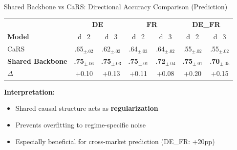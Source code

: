 \documentclass[aspectratio=169]{beamer}
\begin{document}
\begin{frame}{Shared Backbone vs CaRS: Directional Accuracy Comparison (Prediction)}
\begin{table}
\centering
\small
\begin{tabular}{l|cc|cc|cc}
\toprule
& \multicolumn{2}{c|}{\textbf{DE}} & \multicolumn{2}{c|}{\textbf{FR}} & \multicolumn{2}{c}{\textbf{DE\_FR}} \\
\textbf{Model} & d=2 & d=3 & d=2 & d=3 & d=2 & d=3 \\
\midrule
CaRS & .65$_{\pm.02}$ & .62$_{\pm.02}$ & .64$_{\pm.03}$ & .64$_{\pm.02}$ & .55$_{\pm.02}$ & .55$_{\pm.02}$ \\
\textbf{Shared Backbone} & \textbf{.75}$_{\pm.06}$ & \textbf{.75}$_{\pm.03}$ & \textbf{.75}$_{\pm.01}$ & \textbf{.72}$_{\pm.04}$ & \textbf{.75}$_{\pm.01}$ & \textbf{.70}$_{\pm.05}$ \\
\midrule
$\Delta$ & \textcolor{reprogreen}{+0.10} & \textcolor{reprogreen}{+0.13} & \textcolor{reprogreen}{+0.11} & \textcolor{reprogreen}{+0.08} & \textcolor{reprogreen}{+0.20} & \textcolor{reprogreen}{+0.15} \\
\bottomrule
\end{tabular}
\end{table}

\vspace{0.3cm}
\begin{center}
\end{center}

\vspace{0.2cm}
\textbf{Interpretation:}
\begin{itemize}
    \item Shared causal structure acts as \textbf{regularization}
    \item Prevents overfitting to regime-specific noise
    \item Especially beneficial for cross-market prediction (DE\_FR: +20pp)
\end{itemize}
\end{frame}
\end{document}
